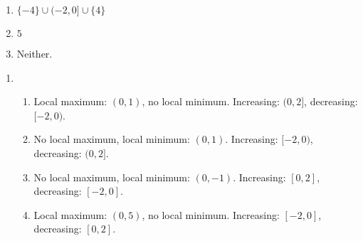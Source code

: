\documentclass{ximera}
\begin{document}
\begin{multicols}{3}
\begin{enumerate}
\setcounter{enumi}{\value{HW}}

\item $\{-4\} \cup (-2,0] \cup \{4\}$
\item  $5$
\item Neither.

\setcounter{HW}{\value{enumi}}
\end{enumerate}
\end{multicols}

\begin{enumerate}
\setcounter{enumi}{\value{HW}}
\addtocounter{enumi}{4}
\item \begin{enumerate}
\item Local maximum: $(0,1)$, no local minimum.  Increasing: $(0,2]$, decreasing: $[-2,0)$.
\item No local maximum,  local minimum: $(0,1)$.  Increasing: $[-2,0)$, decreasing: $(0,2]$.
\item No local maximum,  local minimum: $(0,-1)$.  Increasing: $[0,2]$, decreasing: $[-2,0]$.
\item Local maximum: $(0,5)$, no local minimum.  Increasing: $[-2,0]$, decreasing: $[0,2]$.
\end{enumerate}

\setcounter{HW}{\value{enumi}}
\end{enumerate}
\end{document}
